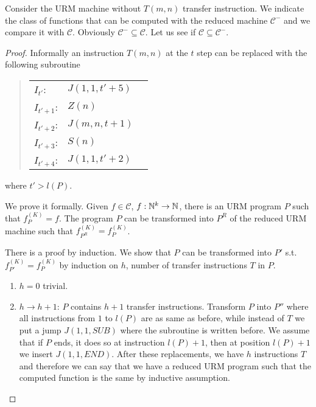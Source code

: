 \begin{exercise}
Consider the URM machine without $T(m, n)$ transfer instruction. We indicate the class
of functions that can be computed with the reduced machine $\mathcal{C}^- $ and
we compare it with $\mathcal{C} $. Obviously $\mathcal{C}^- \subseteq \mathcal{C}
$. Let us see if $\mathcal{C} \subseteq \mathcal{C}^-$. \\
\begin{proof}
Informally an instruction $T(m,n)$ at the $t$ step
can be replaced with the following subroutine
\begin{quote}
  \begin{tabular}{lll}
    $I_{t'}$:   & $J(1,1,t'+5)$  \\
    $I_{t'+1}$: & $Z(n)$        \\
    $I_{t'+2}$: & $J(m,n,t+1)$  \\
    $I_{t'+3}$: & $S(n)$        \\
    $I_{t'+4}$: & $J(1,1,t'+2)$ \\
  \end{tabular}
\end{quote}
where $t'>l(P)$.

We prove it formally. 
Given $f \in \mathcal{C} $, $f: \mathbb{N}^k \rightarrow \mathbb{N} $, there is an URM program $P$ such that $f_P^{(K)}  = f$. The program $P$ can be transformed into $P ^R $ of the reduced URM machine such that $f_{P^R}^{(K)}  = f_{P}^{(K)}$.

There is a proof by induction. We show that $P$ can be transformed into $P' $ s.t. $ f_{P'}^{(K)}  = f_{P}^{(K)} $ by induction on $h$, number of transfer instructions $T$ in $P$.

\begin{enumerate}
  \item $h = 0$ trivial.
  \item $h \rightarrow  h + 1$: $P$ contains $h + 1$ transfer instructions.
  Transform $P$ into $P''$ where all instructions from $1$ to $l(P)$ are as same as before, while instead of $T$ we put a jump $J(1,1, SUB)$ where the subroutine is written before. 
  We assume that if $P$ ends, it does so at instruction $l(P) + 1$, then at position $l(P) + 1$ we insert $J (1,1, END)$. 
  After these replacements, we have $h$ instructions $T$ and therefore we can say that we have a reduced URM program such that the computed function is the same by inductive assumption.
\end{enumerate}
\end{proof}
\end{exercise}

